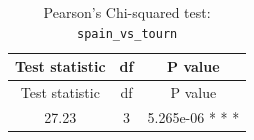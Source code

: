\documentclass[]{article}
\begin{document}
\begin{longtable}[]{@{}ccc@{}}
\caption{Pearson's Chi-squared test:
\texttt{spain\_vs\_tourn}}\tabularnewline
\toprule
\begin{minipage}[b]{0.22\columnwidth}\centering\strut
Test statistic\strut
\end{minipage} & \begin{minipage}[b]{0.06\columnwidth}\centering\strut
df\strut
\end{minipage} & \begin{minipage}[b]{0.22\columnwidth}\centering\strut
P value\strut
\end{minipage}\tabularnewline
\midrule
\endfirsthead
\toprule
\begin{minipage}[b]{0.22\columnwidth}\centering\strut
Test statistic\strut
\end{minipage} & \begin{minipage}[b]{0.06\columnwidth}\centering\strut
df\strut
\end{minipage} & \begin{minipage}[b]{0.22\columnwidth}\centering\strut
P value\strut
\end{minipage}\tabularnewline
\midrule
\endhead
\begin{minipage}[t]{0.22\columnwidth}\centering\strut
27.23\strut
\end{minipage} & \begin{minipage}[t]{0.06\columnwidth}\centering\strut
3\strut
\end{minipage} & \begin{minipage}[t]{0.22\columnwidth}\centering\strut
5.265e-06 * * *\strut
\end{minipage}\tabularnewline
\bottomrule
\end{longtable}
\end{document}
